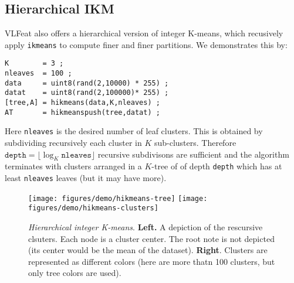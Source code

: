 \documentclass[9pt]{article}
\newcommand{\VLFeat}{{\sc VLFeat}\xspace}
\newcommand{\cmd}  [1]{{\color{red}\tt   #1}}
\begin{document}
\subsection{Hierarchical IKM}\label{ikmeans.hierarchical}

\VLFeat also offers a hierarchical version of integer K-means, which
recusively apply \cmd{ikmeans} to compute finer and finer partitions.
We demonstrates this by:
\begin{verbatim}
K        = 3 ;
nleaves  = 100 ;
data     = uint8(rand(2,10000) * 255) ;
datat    = uint8(rand(2,100000)* 255) ;
[tree,A] = hikmeans(data,K,nleaves) ;
AT       = hikmeanspush(tree,datat) ;
\end{verbatim}
Here \verb$nleaves$ is the desired number of leaf clusters. This is
obtained by subdividing recursively each cluster in $K$
sub-clusters. Therefore $\mathtt{depth} = \lfloor \log_K
\mathtt{nleaves} \rfloor$ recursive subdivisons are sufficient and the
algorithm terminates with clusters arranged in a $K$-tree of of depth
\verb$depth$ which has at least \verb$nleaves$ leaves (but it may have
more).

\begin{figure}
\begin{center}
\texttt{[image: figures/demo/hikmeans-tree]}\hfill
\texttt{[image: figures/demo/hikmeans-clusters]}\\
\end{center}
\caption{{\em Hierarchical integer K-means}. {\bf Left.} A depiction
  of the rescursive clsuters. Each node is a cluster center. The root
  note is not depicted (its center would be the mean of the dataset).
  {\bf Right}. Clusters are represented as different colors (here are
  more thatn 100 clusters, but only tree colors are used).}
\label{fig:hikmeans}
\end{figure}
\end{document}
